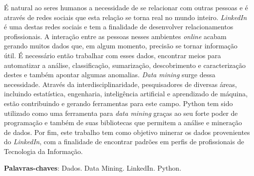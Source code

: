 \begin{resumo}[RESUMO]	
É natural ao seres humanos a necessidade de se relacionar com outras pessoas e é através de redes sociais que esta relação se torna real no mundo inteiro. \textit{LinkedIn} é uma destas redes sociais e tem a finalidade de desenvolver relacionamentos profissionais. A interação entre as pessoas nesses ambientes \textit{online} acabam gerando muitos dados que, em algum momento, precisão se tornar informação útil. É necessário então trabalhar com esses dados, encontrar meios para automatizar a análise, classificação, sumarização, descobrimento e caracterização destes e também apontar algumas anomalias. \textit{Data mining} surge dessa necessidade. Através da interdisciplinaridade, pesquisadores de diversas áreas, incluindo estatística, engenharia, inteligência artificial e aprendizado de máquina, estão contribuindo e gerando ferramentas para este campo. Python tem sido utilizado como uma ferramenta para \textit{data mining} graças ao seu forte poder de programação e também de suas bibliotecas que permitem a análise e mineração de dados. Por fim, este trabalho tem como objetivo minerar os dados provenientes do \textit{LinkedIn}, com a finalidade de encontrar padrões em perfis de profissionais de Tecnologia da Informação.


 \vspace{\onelineskip}
    
 \noindent
 \textbf{Palavras-chaves}: Dados. Data Mining. LinkedIn. Python.
\end{resumo}
